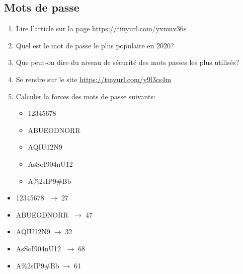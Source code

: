 \documentclass[a4paper,11pt]{article}
\begin{document}
\begin{Form}
\section{Mots de passe}
\begin{activite}
\begin{enumerate}
\item Lire l'article sur la page \mbox{\url{https://tinyurl.com/yxmuv36s}}
\item Quel est le mot de passe le plus populaire en 2020?
\item Que peut-on dire du niveau de sécurité des mots passes les plus utilisés?
\item Se rendre sur le site \mbox{\url{https://tinyurl.com/y9l3cs4m}}
\item Calculer la forces des mots de passe suivants:
\begin{itemize}
\item 12345678
\item ABUEODNORR
\item AQIU12N9
\item AsSoI904nU12
\item A\%2sIP9\#Bb
\end{itemize}
\end{enumerate}
\end{activite}
\begin{commentprof}
\begin{itemize}
\item 12345678 $\;\rightarrow\;$27
\item ABUEODNORR $\;\rightarrow\;$47
\item AQIU12N9$\;\rightarrow\;$32
\item AsSoI904nU12 $\;\rightarrow\;$68
\item A\%2sIP9\#Bb$\;\rightarrow\;$61
\end{itemize}
\end{commentprof}
\end{Form}
\end{document}
